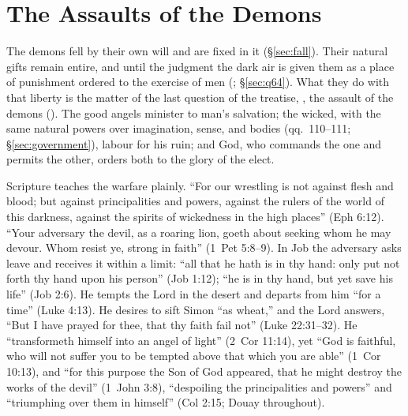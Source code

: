 \section{The Assaults of the Demons}\label{sec:assaults}

The demons fell by their own will and are fixed in it (\S\ref{sec:fall}).
Their natural gifts remain entire, and until the judgment the dark air is
given them as a place of punishment ordered to the exercise of men
(; \S\ref{sec:q64}). What they do with that liberty
is the matter of the last question of the treatise, , the assault of the demons (). The good angels
minister to man's salvation; the wicked, with the same natural powers over
imagination, sense, and bodies (qq.~110--111; \S\ref{sec:government}),
labour for his ruin; and God, who commands the one and permits the other,
orders both to the glory of the elect.

Scripture teaches the warfare plainly. ``For our wrestling is not against
flesh and blood; but against principalities and powers, against the rulers
of the world of this darkness, against the spirits of wickedness in the
high places'' (Eph 6:12). ``Your adversary the devil, as a roaring lion,
goeth about seeking whom he may devour. Whom resist ye, strong in faith''
(1~Pet 5:8--9). In Job the adversary asks leave and receives it within a
limit: ``all that he hath is in thy hand: only put not forth thy hand upon
his person'' (Job 1:12); ``he is in thy hand, but yet save his life'' (Job
2:6). He tempts the Lord in the desert and departs from him ``for a time''
(Luke 4:13). He desires to sift Simon ``as wheat,'' and the Lord answers,
``But I have prayed for thee, that thy faith fail not'' (Luke 22:31--32).
He ``transformeth himself into an angel of light'' (2~Cor 11:14), yet ``God
is faithful, who will not suffer you to be tempted above that which you are
able'' (1~Cor 10:13), and ``for this purpose the Son of God appeared, that
he might destroy the works of the devil'' (1~John 3:8), ``despoiling the
principalities and powers'' and ``triumphing over them in himself'' (Col
2:15; Douay throughout).

